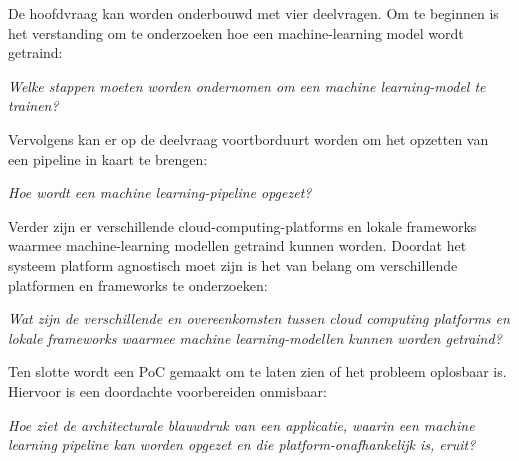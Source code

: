De hoofdvraag kan worden onderbouwd met vier deelvragen. Om te beginnen is het verstanding om te onderzoeken hoe een \gls{machine-learning} model wordt getraind:\smallskip

\begin{quoting}
  \begin{center}
    \textit{
      Welke stappen moeten worden ondernomen om een machine learning-model te trainen?
    }
  \end{center}
\end{quoting}\smallskip

Vervolgens kan er op de deelvraag voortborduurt worden om het opzetten van een pipeline in kaart te brengen:\smallskip

\begin{quoting}
  \begin{center}
    \textit{
      Hoe wordt een machine learning-pipeline opgezet?
    }
  \end{center}
\end{quoting}\smallskip

Verder zijn er verschillende \glspl{cloud-computing-platform} en lokale frameworks waarmee \gls{machine-learning} modellen getraind kunnen worden. Doordat het systeem platform agnostisch moet zijn is het van belang om verschillende platformen en frameworks te onderzoeken:

\begin{quoting}
  \begin{center}
    \textit{
      Wat zijn de verschillende en overeenkomsten tussen cloud computing platforms en lokale frameworks waarmee machine learning-modellen kunnen worden getraind?
    }
  \end{center}
\end{quoting}\smallskip

Ten slotte wordt een PoC gemaakt om te laten zien of het probleem oplosbaar is. Hiervoor is een doordachte voorbereiden onmisbaar:\smallskip

\begin{quoting}
  \begin{center}
    \textit{
      Hoe ziet de architecturale blauwdruk van een applicatie, waarin een machine learning pipeline kan worden opgezet en die platform-onafhankelijk is, eruit?
    }
  \end{center}
\end{quoting}

\cleardoublepage

\mbox{~}